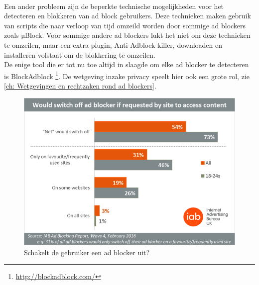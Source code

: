 \documentclass[pdftex,a4paper,12pt,twoside]{report}
\begin{document}
\\
Een ander probleem zijn de beperkte technische mogelijkheden voor het detecteren en blokkeren van ad block gebruikers. Deze technieken maken gebruik van scripts die naar verloop van tijd omzeild worden door sommige ad blockers zoals µBlock. Voor sommige andere ad blockers lukt het niet om deze technieken te omzeilen, maar een extra plugin, Anti-Adblock killer, downloaden en installeren volstaat om de blokkering te omzeilen.
\\
De enige tool die er tot nu toe altijd in slaagde om elke ad blocker te detecteren is BlockAdblock \footnote{\url{http://blockadblock.com/}}. De wetgeving inzake privacy speelt hier ook een grote rol, zie \ref{ch: Wetgevingen en rechtzaken rond ad blockers}.

\begin{figure}[h!]
\centering
\includegraphics[width=12cm]{img/Adblockblock}
\caption{Schakelt de gebruiker een ad blocker uit?}
\label{fig: Adblockblock}
\end{figure}
\end{document}
